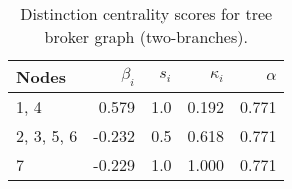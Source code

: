 \begin{table}
\centering
\caption{\label{tab:tree2}Distinction centrality scores for tree broker graph (two-branches).}
\centering
\begin{tabular}[t]{lrrrr}
\toprule
Nodes & $\beta_i$ & $s_i$ & $\kappa_i$ & $\alpha$\\
\midrule
1, 4 & 0.579 & 1.0 & 0.192 & 0.771\\
2, 3, 5, 6 & -0.232 & 0.5 & 0.618 & 0.771\\
7 & -0.229 & 1.0 & 1.000 & 0.771\\
\bottomrule
\end{tabular}
\end{table}
